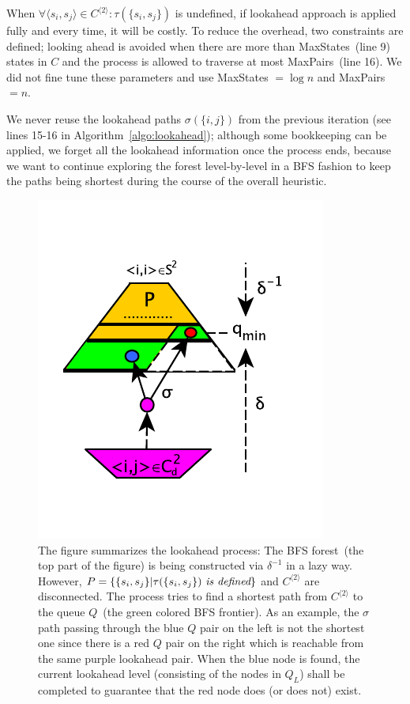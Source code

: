 \documentclass[12pt]{article}
\newcommand{\comment}[2]{{\color{red}{\bf (#1: #2)}}}
\begin{document}
When $\forall \langle s_i,s_j \rangle \in C^{\langle 2 \rangle}: \tau(\{s_i,s_j \})$ is undefined, if lookahead approach is applied fully and every time, it will be costly. To reduce the overhead, two constraints are defined; looking ahead is avoided when there are more than {\sc MaxStates}~(line 9)  states in $C$ and the process is allowed to traverse at most {\sc MaxPairs}~(line 16). We did not fine tune these parameters and use {\sc MaxStates} $= \log n$ and {\sc MaxPairs} $= n$. 

We never reuse the lookahead paths $\sigma(\{ i, j \})$ from the previous iteration (see lines 15-16 in Algorithm~\ref{algo:lookahead}); although some bookkeeping can be applied, we forget all the lookahead information once the process ends, because we want to continue exploring the forest level-by-level in a BFS fashion to keep the paths being shortest during the course of the overall heuristic. 



\begin{figure}[ht]
	\centering
	\includegraphics{figs/la.pdf}
	\caption{The figure summarizes the lookahead process: The BFS forest~(the top part of the figure) is being constructed via $\delta^{-1}$ in a lazy way. However, $P = \{ \{s_i, s_j \} | \tau(\{s_i, s_j \})~ \mbox{\em is defined} \}$ and $C^{\langle 2 \rangle}$ are disconnected. The process tries to find a shortest path from $C^{\langle 2 \rangle}$ to the queue $Q$~(the green colored BFS frontier). As an example, the $\sigma$ path passing through the blue $Q$ pair on the left is not the shortest one since there is a red $Q$ pair on the right which is reachable from the same purple lookahead pair. When the blue node is found, the current lookahead level (consisting of the nodes in $Q_L$) shall be completed to guarantee that the red node does (or does not) exist.\comment{sertac}{notation degisecek}}
	\label{fig:lookahead}
\end{figure}
\end{document}
